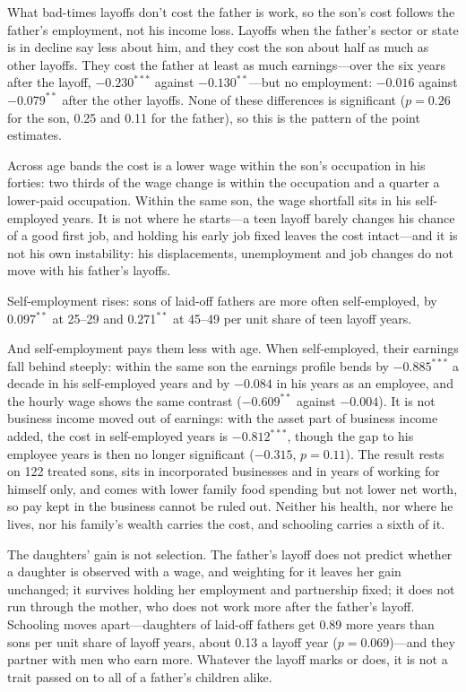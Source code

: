 What bad-times layoffs don't cost the father is work, so the son's cost follows the father's employment, not his
income loss. Layoffs when the father's sector or state is in decline say less about him, and they cost the son about
half as much as other layoffs. They cost the father at least as much earnings---over the six years after the layoff,
$-0.230^{***}$ against $-0.130^{**}$---but no employment: $-0.016$ against $-0.079^{**}$ after the other layoffs. None
of these differences is significant ($p = 0.26$ for the son, 0.25 and 0.11 for the father), so this is the pattern of
the point estimates.

Across age bands the cost is a lower wage within the son's occupation in his forties: two thirds of the wage change
is within the occupation and a quarter a lower-paid occupation. Within the same son, the wage shortfall sits in his
self-employed years. It is not where he starts---a teen layoff barely changes his chance of
a good first job, and holding his early job fixed leaves the cost intact---and it is not his own instability: his
displacements, unemployment and job changes do not move with his father's layoffs.

Self-employment rises: sons of laid-off fathers are more often self-employed, by 0.097$^{**}$ at 25--29 and 0.271$^{**}$
at 45--49 per unit share of teen layoff years.

And self-employment pays them less with age. When self-employed, their earnings fall behind steeply: within the same
son the earnings profile bends by $-0.885^{***}$ a decade in his self-employed years and by $-0.084$ in his years as an
employee, and the hourly wage shows the same contrast ($-0.609^{**}$ against $-0.004$). It is not business income
moved out of earnings: with the asset part of business income added, the cost in self-employed years is
$-0.812^{***}$, though the gap to his employee years is then no longer significant ($-0.315$, $p = 0.11$). The result rests on
122 treated sons, sits in incorporated businesses and in years of working for himself only, and comes with lower
family food spending but not lower net worth, so pay kept in the business cannot be ruled out. Neither his health, nor where he
lives, nor his family's wealth carries the cost, and schooling carries a sixth of it.

The daughters' gain is not selection. The father's layoff does not predict whether a daughter is observed with a wage,
and weighting for it leaves her gain unchanged; it survives holding her employment and partnership fixed; it does not
run through the mother, who does not work more after the father's layoff. Schooling moves apart---daughters of laid-off
fathers get 0.89 more years than sons per unit share of layoff years, about 0.13 a layoff year ($p = 0.069$)---and
they partner with men who earn more. Whatever the layoff marks or does, it is not a trait passed on to all of a
father's children alike.


